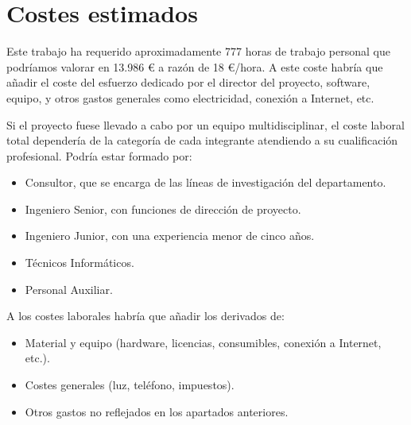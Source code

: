 \section {Costes estimados}

Este trabajo ha requerido aproximadamente 777 horas de trabajo personal que
podríamos valorar en 13.986 € a razón de 18 €/hora. A este coste habría que añadir el coste del esfuerzo dedicado por el director del proyecto, software, equipo, y otros gastos generales como electricidad, conexión a Internet, etc.

Si el proyecto fuese llevado a cabo por un equipo multidisciplinar, el coste laboral total dependería de la categoría de cada integrante atendiendo a su cualificación profesional. Podría estar formado por:
\begin{itemize}
\item Consultor, que se encarga de las líneas de investigación del
departamento.
\item Ingeniero Senior, con funciones de dirección de proyecto.
\item Ingeniero Junior, con una experiencia menor de cinco años.
\item Técnicos Informáticos.
\item Personal Auxiliar.
\end{itemize}

A los costes laborales habría que añadir los derivados de:
\begin{itemize}
\item Material y equipo (hardware, licencias, consumibles, conexión a
Internet, etc.).
\item Costes generales (luz, teléfono, impuestos).
\item Otros gastos no reflejados en los apartados anteriores.
\end{itemize}
